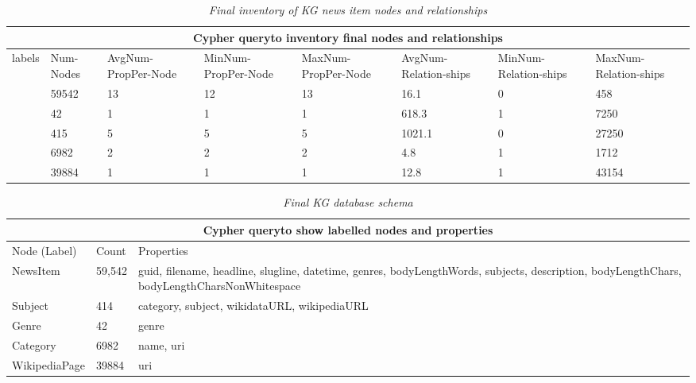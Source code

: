 \documentclass[11pt]{article}
\begin{document}
  \begin{table}
    \begin{tabular}{ |p{2cm}|p{1cm}|p{1.5cm}|p{1.5cm}|p{1.5cm}|p{1.5cm}|p{1.5cm}|p{1.5cm}| }
    \hline
    \multicolumn{8}{|c|}{Cypher query\protect \footnotemark to inventory final nodes and relationships} \\\hline
    labels&Num-Nodes&AvgNum-PropPer-Node&MinNum-PropPer-Node&MaxNum-PropPer-Node&AvgNum-Relation-ships&MinNum-Relation-ships&MaxNum-Relation-ships\\
    \hline
    [``NewsItem'']&59542&13&12&13&16.1&0&458\\
    \hline
    [``Genre'']&42&1&1&1&618.3&1&7250\\
    \hline
    [``Subject'']&415&5&5&5&1021.1&0&27250\\
    \hline
    [``Resource'', ``Category'']&6982&2&2&2&4.8&1&1712\\
    \hline
    [``Resource'', ``WikipediaPage'']&39884&1&1&1&12.8&1&43154\\
    \hline
    \end{tabular}

    \caption{\textit{Final inventory of KG news item nodes and relationships}}
  \end{table}


  \begin{table}
    \begin{tabular}{ |p{3cm}||p{2cm}|p{7cm}|  }
    \hline
    \multicolumn{3}{|c|}{Cypher query\protect \footnotemark to show labelled nodes and properties} \\
    \hline
    Node (Label)& Count &Properties\\
    \hline
    NewsItem&59,542&guid, filename, headline, slugline, datetime, genres, bodyLengthWords, subjects, description, bodyLengthChars, bodyLengthCharsNonWhitespace\\
    \hline
    Subject&414&category, subject, wikidataURL, wikipediaURL\\
    \hline
    Genre&42&genre\\
    \hline
    Category&6982&name, uri\\
    \hline
    WikipediaPage&39884&uri\\
    \hline
    \end{tabular}
    \caption{\textit{Final KG database schema}}
  \end{table}
\end{document}
